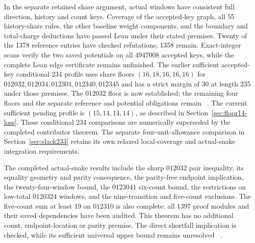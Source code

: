\documentclass[11pt,a4paper]{article}
\theoremstyle{definition}
\theoremstyle{remark}
\begin{document}
In the separate retained share argument, actual windows have consistent full direction,
history and count keys. Coverage of the accepted-key graph, all 55
history-share rules, the other baseline weight components, and the boundary
and total-charge deductions have passed Lean under their stated premises.
Twenty of the 1378 reference entries have checked refutations; 1358 remain.
Exact-integer scans verify the two saved potentials on all 4947008 accepted
keys, while the complete Lean edge certificate remains unfinished.
The earlier sufficient accepted-key conditional 234 profile uses share floors
$(16,18,16,16,16)$ for $012032,012034,012301,012340,012345$ and has a
strict margin of 30 at length 235 under those premises. The $012032$
floor is now established; the remaining four floors and the separate
reference and potential obligations remain
~\cite{referenceunionarchive,potentialcertificatearchive,share152archive}.
The current sufficient pending profile is $(15,14,14,14)$, as described in
Section~\ref{sec:floor14-loss}. These conditional 234 comparisons are
numerically superseded by the completed contributor theorem. The separate
four-unit-allowance comparison in Section~\ref{sec:slack233} retains its
own relaxed local-coverage and actual-snake integration requirements.

The completed actual-snake results include the sharp $012032$ pair
inequality, its equality geometry and parity consequence, the parity-free
endpoint implication, the twenty-four-window bound, the $0123041$
six-count bound, the restrictions on low-total $0120324$ windows, and the
nine-transition and five-count exclusions. The five-count sum at least 19
on $012310$ is also complete: all 1397 proof modules and their saved
dependencies have been audited. This theorem has no additional count,
endpoint-location or parity premise. The direct shortfall implication is
checked, while its sufficient universal upper bound remains unresolved
~\cite{count24archive,fivecount140archive,share145archive}.
\end{document}
